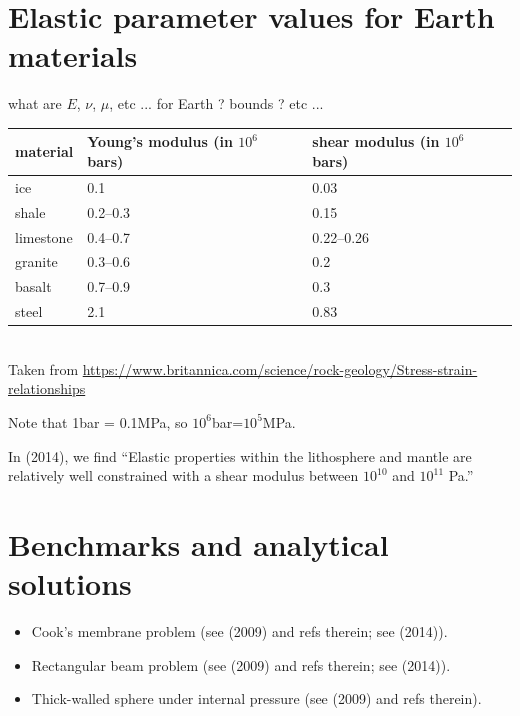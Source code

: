 \newpage
\section{Elastic parameter values for Earth materials}


what are $E$, $\nu$, $\mu$, etc ... for Earth ? bounds ? etc ...

\begin{center}
\begin{tabular}{lll}
\hline
material & Young's modulus (in $10^6$ bars) &	shear modulus (in $10^6$ bars)  \\
\hline\hline
ice &	0.1 &	0.03\\
shale &	0.2–0.3 	& 0.15\\
limestone &	0.4–0.7 &	0.22–0.26\\
granite &	0.3–0.6 &	0.2\\
basalt &	0.7–0.9 &	0.3\\
steel &	2.1 &	0.83 \\
\hline
\end{tabular}\\
{\captionfont Taken from 
\url{https://www.britannica.com/science/rock-geology/Stress-strain-relationships}}
\end{center}

Note that 1bar = 0.1MPa, so $10^6$bar=$10^5$MPa.

In \textcite{famc14} (2014), we find ``Elastic properties within the 
lithosphere and mantle are relatively well constrained with a shear 
modulus between $10^{10}$ and $10^{11}$ Pa.''


\section{Benchmarks and analytical solutions}

\begin{itemize}
\item Cook's membrane problem (see \textcite{lami09} (2009) and refs therein; 
see \textcite{lami14} (2014)).
\item Rectangular beam problem (see \textcite{lami09} (2009) and refs therein; 
see \textcite{lami14} (2014)).
\item Thick-walled sphere under internal pressure (see \textcite{lami09} (2009) and refs therein).
\end{itemize}


